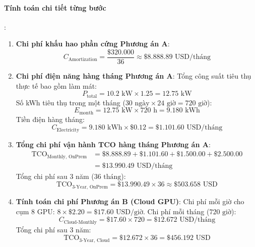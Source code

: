 \begin{example}
\paragraph{Tính toán chi tiết từng bước}:
\begin{enumerate}
  \item \textbf{Chi phí khấu hao phần cứng Phương án A}:
    \begin{equation*}
    C_{\text{Amortization}} = \frac{\$320.000}{36} \approx \$8.888.89\text{ USD/tháng}
    \end{equation*}
  \item \textbf{Chi phí điện năng hàng tháng Phương án A}:
    Tổng công suất tiêu thụ thực tế bao gồm làm mát:
    \begin{equation*}
    P_{\text{total}} = 10.2\text{ kW} \times 1.25 = 12.75\text{ kW}
    \end{equation*}
    Số kWh tiêu thụ trong một tháng ($30\text{ ngày} \times 24\text{ giờ} = 720\text{ giờ}$):
    \begin{equation*}
    E_{\text{month}} = 12.75\text{ kW} \times 720\text{ h} = 9.180\text{ kWh}
    \end{equation*}
    Tiền điện hàng tháng:
    \begin{equation*}
    C_{\text{Electricity}} = 9.180\text{ kWh} \times \$0.12 = \$1.101.60\text{ USD/tháng}
    \end{equation*}
  \item \textbf{Tổng chi phí vận hành TCO hàng tháng Phương án A}:
    \begin{align*}
    \text{TCO}_{\text{Monthly, OnPrem}} &= \$8.888.89 + \$1.101.60 + \$1.500.00 + \$2.500.00 \\
    &= \$13.990.49\text{ USD/tháng}
    \end{align*}
    Tổng chi phí sau 3 năm ($36\text{ tháng}$):
    \begin{equation*}
    \text{TCO}_{\text{3-Year, OnPrem}} = \$13.990.49 \times 36 \approx \$503.658\text{ USD}
    \end{equation*}

  \item \textbf{Tính toán chi phí Phương án B (Cloud GPU)}:
    Chi phí mỗi giờ cho cụm 8 GPU: $8 \times \$2.20 = \$17.60\text{ USD/giờ}$.
    Chi phí mỗi tháng ($720\text{ giờ}$):
    \begin{equation*}
    C_{\text{Cloud-Monthly}} = \$17.60 \times 720 = \$12.672\text{ USD/tháng}
    \end{equation*}
    Tổng chi phí sau 3 năm:
    \begin{equation*}
    \text{TCO}_{\text{3-Year, Cloud}} = \$12.672 \times 36 = \$456.192\text{ USD}
    \end{equation*}


\end{enumerate}
\end{example}
